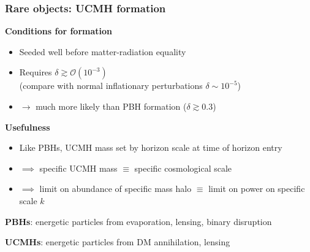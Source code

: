 \documentclass[xcolor=dvipsnames]{beamer}
\begin{document}
\begin{frame}
  \frametitle{Rare objects: UCMH formation}

    \textbf{Conditions for formation}
    \begin{itemize}
      \item{Seeded well before matter-radiation equality}\vspace{1mm}
      \item{Requires $\delta \gtrsim \mathcal{O}(10^{-3})$}\\(compare with normal inflationary perturbations $\delta \sim 10^{-5}$)\vspace{1mm}
      \item{$\longrightarrow$ much more likely than PBH formation ($\delta \gtrsim 0.3$)}\vspace{1mm}
    \end{itemize} 

    \textbf{Usefulness}
    \begin{itemize}
      \item{Like PBHs, UCMH mass set by horizon scale at time of horizon entry}\vspace{1mm}
      \item{$\implies$ specific UCMH mass $\equiv$ specific cosmological scale}\vspace{1mm}
      \item{$\implies$ limit on abundance of specific mass halo $\equiv$ limit on power on specific scale $k$}
    \end{itemize}

\end{frame}



  \bi
    \item[\textbf{PBHs}:] energetic particles from evaporation, lensing, binary disruption
    \item[\textbf{UCMHs}:] energetic particles from DM annihilation, lensing
  \ei
\end{document}
